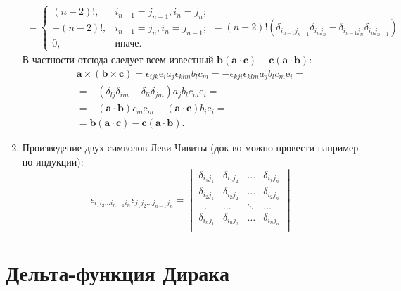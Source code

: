 \documentclass[a4paper,14pt]{extreport} %
\renewcommand{\vec}[1]{\boldsymbol{#1}}
\newcommand{\ort}[1]{\boldsymbol{\mathrm{e}}_#1}
\begin{document}
\begin{enumerate}
\begin{gather*}
		=
		\begin{cases}
		(n-2)!, & i_{n-1} = j_{n-1}, i_n = j_n; \\
		-(n-2)!, & i_{n-1} = j_n, i_n = j_{n-1}; \\
		0, & \text{иначе.}
		\end{cases} =
		(n-2)!(\delta_{i_{n-1} j_{n-1}} \delta_{i_{n} j_{n}} - \delta_{i_{n-1} j_{n}} \delta_{i_{n} j_{n-1}})
		\end{gather*}
		В частности отсюда следует всем известный $\vec{b}(\vec{a}\cdot\vec{c}) - \vec{c}(\vec{a}\cdot\vec{b})$:
		\begin{gather*}
		\vec{a}\times(\vec{b}\times\vec{c}) = \epsilon_{ijk} \ort{i} a_j \epsilon_{klm} b_l c_m = -\epsilon_{kji}\epsilon_{klm} a_j b_l c_m \ort{i} = \\ =
		- (\delta_{lj}\delta_{im} - \delta_{li}\delta_{jm}) a_j b_l c_m \ort{i} = \\ = - (\vec{a}\cdot\vec{b}) c_m \ort{m} + (\vec{a}\cdot\vec{c}) b_i \ort{i} = \\ = \vec{b}(\vec{a}\cdot\vec{c}) - \vec{c}(\vec{a}\cdot\vec{b}).
		\end{gather*}
		\item Произведение двух символов Леви-Чивиты (док-во можно провести например по индукции):
		\[
		\epsilon_{i_1 i_2 \ldots i_{n-1} i_n} \epsilon_{j_1 j_2 \ldots j_{n-1} j_n} =
		\begin{vmatrix}
		\delta_{i_1 j_1} & \delta_{i_1 j_2} & \ldots & \delta_{i_1 j_n} \\
		\delta_{i_2 j_1} & \delta_{i_2 j_2} & \ldots & \delta_{i_2 j_n} \\
		\ldots & \ldots & \ddots & \ldots \\
		\delta_{i_n j_1} & \delta_{i_n j_2} & \ldots & \delta_{i_n j_n} \\
		\end{vmatrix}
		\]
		
		\end{enumerate}
		
	\section{Дельта-функция Дирака}
	
\end{document}
